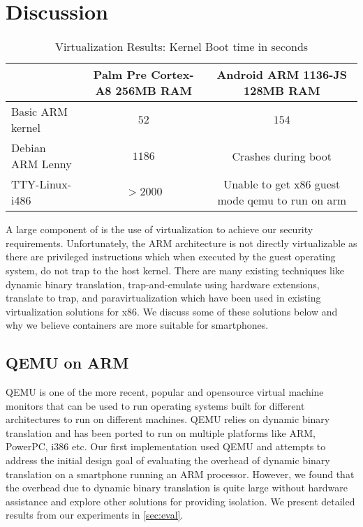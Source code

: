 \section{Discussion}
\label{sec:discuss}

\begin{table*}[tbh]
\begin{tabular}{|l|c|c|}
\hline & Palm Pre Cortex-A8 256MB RAM & Android ARM 1136-JS 128MB RAM \\ 
\hline Basic ARM kernel & $52$ & $154$ \\ [2pt]
 Debian ARM Lenny & $1186$ & Crashes during boot \\ [2pt]
 TTY-Linux-i486 & $>2000$ & Unable to get x86 guest mode qemu to run on arm \\[2pt]
\hline 
\end{tabular}
\caption{
Virtualization Results: Kernel Boot time in seconds
}
\label{tab:virt_results}
\end{table*}

A large component of \emph{\proj} is the use of virtualization to achieve our security requirements.  Unfortunately, the ARM architecture is not directly virtualizable as there are privileged instructions which when executed by the guest operating system, do not trap to the host kernel. There are many existing techniques like dynamic binary translation, trap-and-emulate using hardware extensions, translate to trap, and paravirtualization which have been used in existing virtualization solutions for x86. We discuss some of these solutions below and why we believe containers are more suitable for smartphones.

\subsection{QEMU on ARM}
QEMU \cite{qemu} is one of the more recent, popular and opensource virtual machine monitors that can be used to run operating systems built for different architectures to run on different machines. QEMU relies on dynamic binary translation and has been ported to run on multiple platforms like ARM, PowerPC, i386 etc. Our first implementation used QEMU and attempts to address the initial design goal of evaluating the overhead of dynamic binary translation on a smartphone running an ARM processor. However, we found that the overhead due to dynamic binary translation is quite large without hardware assistance and explore other solutions for providing isolation. We present detailed results from our experiments in \ref{sec:eval}.

